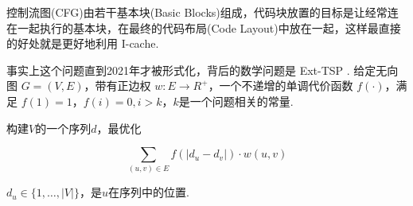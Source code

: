 控制流图(CFG)由若干基本块(Basic Blocks)组成，代码块放置的目标是让经常连在一起执行的基本块，在最终的代码布局(Code Layout)中放在一起，这样最直接的好处就是更好地利用 I-cache.

事实上这个问题直到2021年才被形式化，背后的数学问题是 Ext-TSP \cite{mestre2021extended}. 给定无向图 $G = (V, E)$，带有正边权 $w: E \rightarrow R^{+}$，一个不递增的单调代价函数 $f(\cdot)$，满足 $f(1) = 1$，$f(i) = 0, i > k$，$k$是一个问题相关的常量.

构建$V$的一个序列$d$，最优化

\begin{equation}
    \sum_{(u, v) \in E} f(\left\lvert d_u - d_v \right\rvert) \cdot w(u, v)
\end{equation}

$d_u \in \lbrace 1, \dots, \left\lvert V \right\rvert \rbrace$，是$u$在序列中的位置.